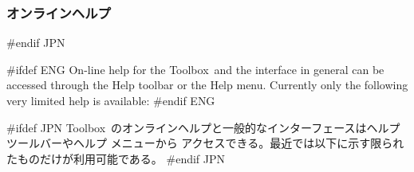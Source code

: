\documentclass[\pformat,12pt]{article}
\newcommand{\Toolbox}{Toolbox}
\newcommand{\Toolbox}{Toolbox}
\newcommand{\guicmd}[1]{{\sf #1}}
\newcommand{\guicmd}[1]{{\gt #1}}
\begin{document}
\subsubsection{オンラインヘルプ}
#endif JPN
% 
%


#ifdef ENG
On-line help for the \Toolbox\ and the interface in general can %
be accessed through the \guicmd{Help} toolbar or the \guicmd{Help}
menu. Currently only the following very limited help is available:
#endif ENG

#ifdef JPN
\Toolbox\ のオンラインヘルプと一般的なインターフェースは\guicmd{ヘルプ} ツールバーや\guicmd{ヘルプ} メニューから
アクセスできる。最近では以下に示す限られたものだけが利用可能である。
#endif JPN
\end{document}
